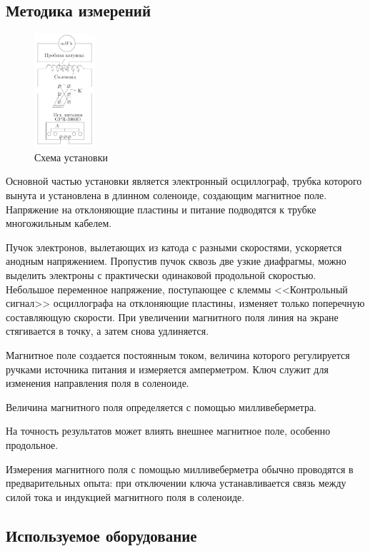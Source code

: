 \documentclass[a4paper, 12pt]{article}
\begin{document}
\subsection{Методика измерений}

\begin{figure}
  \begin{center}
    \includegraphics[width = 0.2\textwidth]{1.png}
  \end{center}
  \caption{Схема установки}
  \label{ris1}
\end{figure}
Основной частью установки является электронный осциллограф, трубка которого вынута и установлена в длинном соленоиде, создающим магнитное поле. Напряжение на отклоняющие пластины и питание подводятся к трубке многожильным кабелем.

Пучок электронов, вылетающих из катода с разными скоростями, ускоряется анодным напряжением. Пропустив пучок сквозь две узкие диафрагмы, можно выделить электроны с практически одинаковой продольной скоростью. Небольшое переменное напряжение, поступающее с клеммы <<Контрольный сигнал>> осциллографа на отклоняющие пластины, изменяет только поперечную составляющую скорости. При увеличении магнитного поля линия на экране стягивается в точку, а затем снова удлиняется. 

Магнитное поле создается постоянным током, величина которого регулируется ручками источника питания и измеряется амперметром. Ключ служит для изменения направления поля в соленоиде.

Величина магнитного поля определяется с помощью милливеберметра.

На точность результатов может влиять внешнее магнитное поле, особенно продольное. 

Измерения магнитного поля с помощью милливеберметра обычно проводятся в предварительных опыта: при отключении ключа устанавливается связь между силой тока и индукцией магнитного поля в соленоиде. 

\subsection{Используемое оборудование}
\end{document}
